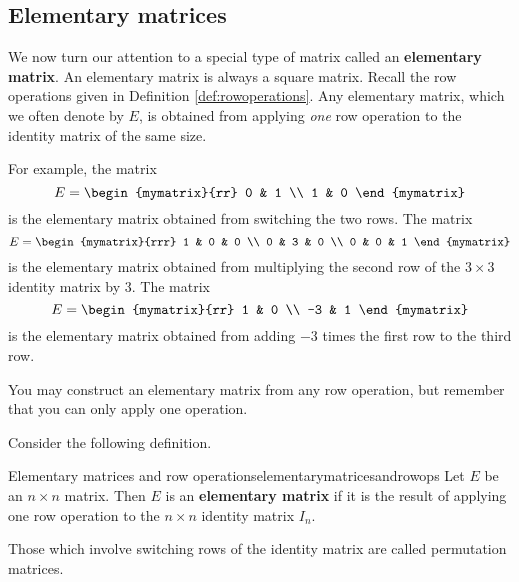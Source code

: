 
\subsection{Elementary matrices}

We now turn our attention to a special type of matrix called an \textbf{elementary matrix}. 
An elementary matrix is always a square matrix. Recall the row operations given in Definition \ref{def:rowoperations}.
Any elementary matrix, which we often denote by $E$, is obtained from applying
{\em one\em} row operation to the identity matrix of the same size. 

For example, the matrix
\begin{equation*}
E = 
\begin{mymatrix}{rr}
0 & 1 \\
1 & 0
\end{mymatrix}
\end{equation*}
is the elementary matrix obtained from switching the two rows. 
The matrix 
\begin{equation*}
E = 
\begin{mymatrix}{rrr}
1 & 0 & 0 \\
0 & 3 & 0 \\
0 & 0 & 1
\end{mymatrix}
\end{equation*}
is the elementary matrix obtained from multiplying the second row of the $3 \times 3$ identity matrix
by $3$.
The matrix
\begin{equation*}
E = 
\begin{mymatrix}{rr}
1 & 0 \\
-3 & 1
\end{mymatrix}
\end{equation*}
is the elementary matrix obtained from adding $-3$ times the first row to the third row.

You may construct an elementary matrix from any row operation, but remember that you can only apply one operation.

Consider the following definition. 

\begin{definition}{Elementary matrices and row operations}{elementarymatricesandrowops}
Let $E$ be an $n \times n$ matrix. Then $E$ is an \textbf{elementary matrix} 
if it is the result of applying one row operation to the $n \times n$ identity matrix $I_n$. 

Those which involve switching rows of the identity matrix are called
permutation matrices.
\end{definition}

